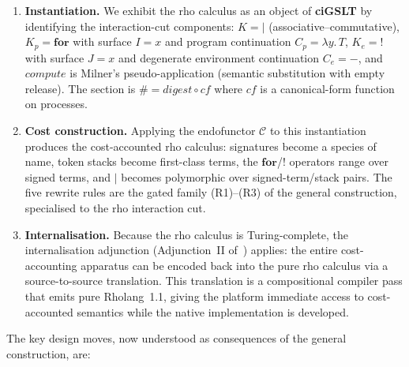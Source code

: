 \documentclass[11pt,a4paper]{article}
\newcommand{\Par}{\mathbin{|}}
\newcommand{\forc}{\mathbf{for}}
\newcommand{\hashf}{\texttt{\#}}
\begin{document}
\begin{enumerate}[label=\textbf{Phase \arabic*.}]
  \item \textbf{Instantiation.}  We exhibit the rho calculus
    as an object of \textbf{ciGSLT} by identifying the
    interaction-cut components: $K = \Par$ (associative--commutative), $K_p = \forc$ with surface
    $I = x$ and program continuation $C_p = \lambda y.\,T$,
    $K_e = {!}$ with surface $J = x$ and degenerate
    environment continuation $C_e = -$, and $\mathit{compute}$
    is Milner's pseudo-application (semantic substitution with
    empty release).  The section is $\hashf\!{} = \mathit{digest}
    \circ \mathit{cf}$ where $\mathit{cf}$ is a canonical-form
    function on processes.

  \item \textbf{Cost construction.}  Applying the endofunctor
    $\mathcal{C}$ to this instantiation produces the
    cost-accounted rho calculus: signatures become a species
    of name, token stacks become first-class terms, the
    $\forc$/$!$ operators range over signed terms, and $\Par$
    becomes polymorphic over signed-term/stack pairs.  The five
    rewrite rules are the gated family (R1)--(R3) of the
    general construction, specialised to the rho interaction cut.

  \item \textbf{Internalisation.}  Because the rho calculus is
    Turing-complete, the internalisation adjunction
    (Adjunction~II of~\cite{CostEndofunctor}) applies: the
    entire cost-accounting apparatus can be encoded back into
    the pure rho calculus via a source-to-source translation.
    This translation is a compositional compiler pass that
    emits pure Rholang~1.1, giving the platform immediate
    access to cost-accounted semantics while the native
    implementation is developed.
\end{enumerate}

\noindent
The key design moves, now understood as consequences of the
general construction, are:
\end{document}
